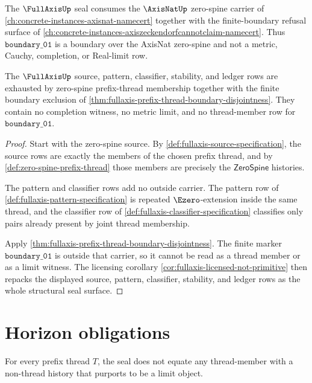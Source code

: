 The $\FullAxisUp$ seal consumes the $\AxisNatUp$ zero-spine carrier of
\autoref{ch:concrete-instances-axisnat-namecert} together with the
finite-boundary refusal surface of
\autoref{ch:concrete-instances-axiszeckendorfcannotclaim-namecert}. Thus
$\mathtt{boundary\_01}$ is a boundary over the AxisNat zero-spine and not a
metric, Cauchy, completion, or Real-limit row.

\begin{theorem}
\label{thm:fullaxis-seal-source-exhaustion}
The $\FullAxisUp$ source, pattern, classifier, stability, and ledger rows are
exhausted by zero-spine prefix-thread membership together with the finite
boundary exclusion of
\autoref{thm:fullaxis-prefix-thread-boundary-disjointness}. They contain no
completion witness, no metric limit, and no thread-member row for
$\mathtt{boundary\_01}$.
\end{theorem}
\begin{proof}
Start with the zero-spine source. By
\autoref{def:fullaxis-source-specification}, the source rows are exactly the
members of the chosen prefix thread, and by
\autoref{def:zero-spine-prefix-thread} those members are precisely the
$\mathsf{ZeroSpine}$ histories.

The pattern and classifier rows add no outside carrier. The pattern row of
\autoref{def:fullaxis-pattern-specification} is repeated $\Ezero$-extension
inside the same thread, and the classifier row of
\autoref{def:fullaxis-classifier-specification} classifies only pairs already
present by joint thread membership.

Apply \autoref{thm:fullaxis-prefix-thread-boundary-disjointness}. The finite
marker $\mathtt{boundary\_01}$ is outside that carrier, so it cannot be read as a
thread member or as a limit witness. The licensing corollary
\autoref{cor:fullaxis-licensed-not-primitive} then repacks the displayed source,
pattern, classifier, stability, and ledger rows as the whole structural seal
surface.
\end{proof}

\section{Horizon obligations}

\begin{theorem}
\label{thm:fullaxis-boundary-marker-not-limit}
For every prefix thread \(T\), the seal does not equate any thread-member with a non-thread history that purports to be a limit object.
\end{theorem}

